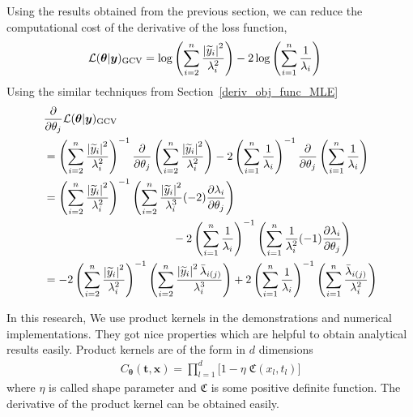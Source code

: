 \documentclass{iitthesis}          %
\newcommand{\bm}[1]{\boldsymbol{#1}}
\newcommand{\vtheta}{{\bm{\theta}}}
\newcommand{\vt}{\bm{t}}
\newcommand{\vx}{\bm{x}}
\newcommand{\vy}{\bm{y}}
\newcommand{\GCV}{\textup{GCV}}
\def\abs#1{\ensuremath{\left \lvert #1 \right \rvert}}
\newcommand\secref{Section~\ref}
\begin{document}
Using the results obtained from the previous section, we can reduce the computational cost of the derivative of the loss function,
\begin{align*}
\mathcal{L}(\vtheta | \vy)_\GCV
&= \log \left ( \sum_{i=2}^n \frac{\abs{\widetilde{y}_i}^2}{\lambda_i^2} 
\right) -2\log\left( \sum_{i=1}^n \frac{1}{\lambda_i} \right)
\end{align*}
Using the similar techniques from \secref{deriv_obj_func_MLE}
\begin{align*}
& \frac{\partial}{\partial \theta_j}  \mathcal{L}(\vtheta | \vy)_\GCV
\\
&= \left ( \sum_{i=2}^n \frac{\abs{\widetilde{y}_i}^2}{\lambda_i^2} \right)^{-1}
\frac{\partial}{\partial \theta_j} \left ( \sum_{i=2}^n \frac{\abs{\widetilde{y}_i}^2}{\lambda_i^2} \right)
 -2 \left( \sum_{i=1}^n \frac{1}{\lambda_i} \right)^{-1}
\frac{\partial}{\partial \theta_j} \left( \sum_{i=1}^n \frac{1}{\lambda_i} \right)
\\
&= \left ( \sum_{i=2}^n \frac{\abs{\widetilde{y}_i}^2}{\lambda_i^2} \right)^{-1}
 \left ( \sum_{i=2}^n \frac{\abs{\widetilde{y}_i}^2}{\lambda_i^3} (-2) \frac{\partial\lambda_i}{\partial \theta_j}  \right)
\\ & \hspace{4cm} 
-2 \left( \sum_{i=1}^n \frac{1}{\lambda_i} \right)^{-1}
\left( \sum_{i=1}^n \frac{1}{\lambda_i^2} (-1)\frac{\partial \lambda_i}{\partial \theta_j}  \right)
\\
&= -2 \left ( \sum_{i=2}^n \frac{\abs{\widetilde{y}_i}^2}{\lambda_i^2} \right)^{-1}
\left ( \sum_{i=2}^n \frac{\abs{\widetilde{y}_i}^2 \bar{\lambda}_{i(j)} }{\lambda_i^3}    \right)
+ 2 \left( \sum_{i=1}^n \frac{1}{\lambda_i} \right)^{-1}
\left( \sum_{i=1}^n \frac{\bar{\lambda}_{i(j)} }{\lambda_i^2}  \right)
\end{align*}



In this research, We use product kernels in the demonstrations and numerical implementations. They got nice properties which are helpful to obtain analytical results easily. Product kernels are of the form in $d$ dimensions
\begin{align}
\label{eqn:prod_kernel}
C_\vtheta(\vt, \vx) = 
\prod_{l=1}^d \biggl[ 1 - \eta \; \mathfrak{C}(x_l,t_l) \biggr]
\end{align}
where $\eta$ is called shape parameter and $\mathfrak{C}$ is some positive definite function. The derivative of the product kernel can be obtained easily.
\end{document}
